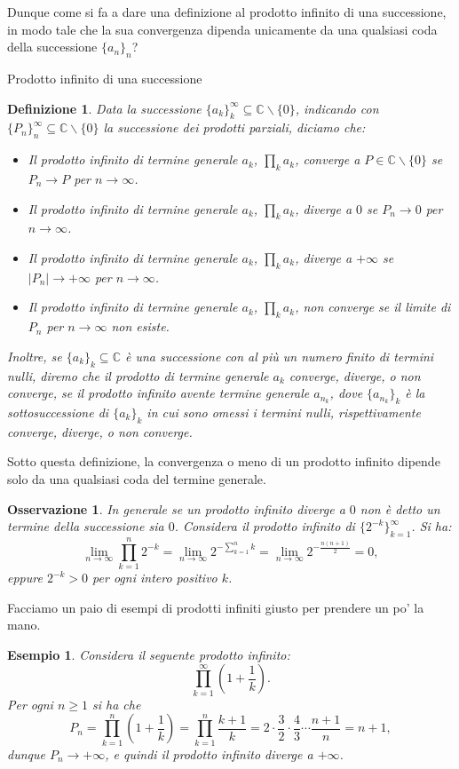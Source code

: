 \documentclass[11pt]{book}
\theoremstyle{Definizione}
\newtheorem*{mydef}{Definizione}
\theoremstyle{TeoremaProposizioneLemmaCorollarioCongettura}
\theoremstyle{OsservazioneNotaEsempio}
\newtheorem{myobs}{Osservazione}[section]
\newtheorem{myes}{Esempio}[section]
\newcommand{\C}{\mathbb{C}}
\newcommand{\tolto}{\smallsetminus}
\begin{document}
Dunque come si fa a dare una definizione al prodotto infinito di una successione, in modo tale che la sua convergenza dipenda unicamente da una qualsiasi coda della successione $\{a_n\}_n$?
\begin{boxdef}{Prodotto infinito di una successione}
\begin{mydef}
Data la successione $\{a_k\}_k^\infty\subseteq \C\tolto \{0\}$, indicando con $\{P_n\}_n^\infty\subseteq \C\tolto \{0\}$ la successione dei prodotti parziali, diciamo che:
\begin{itemize}
\item Il prodotto infinito di termine generale $a_k$, $\prod_k a_k$, converge a $P\in \C\tolto \{0\}$ se $P_n\to P$ per $n\to \infty$.
\item Il prodotto infinito di termine generale $a_k$, $\prod_k a_k$, diverge a $0$ se $P_n\to 0$ per $n\to \infty$.
\item Il prodotto infinito di termine generale $a_k$, $\prod_k a_k$, diverge a $+\infty$ se $|P_n| \to +\infty$ per $n\to \infty$.
\item Il prodotto infinito di termine generale $a_k$, $\prod_k a_k$, non converge se il limite di $P_n$ per $n\to \infty$ non esiste.
\end{itemize}
Inoltre, se $\{a_k\}_k\subseteq \C$ è una successione con al più un numero finito di termini nulli, diremo che il prodotto di termine generale $a_k$ converge, diverge, o non converge, se il prodotto infinito avente termine generale $a_{n_k}$, dove $\{a_{n_k}\}_k$ è la sottosuccessione di $\{a_k\}_k$ in cui sono omessi i termini nulli, rispettivamente converge, diverge, o non converge.
\end{mydef}
\end{boxdef}
\noindent
Sotto questa definizione, la convergenza o meno di un prodotto infinito dipende solo da una qualsiasi coda del termine generale.
\begin{myobs}
In generale se un prodotto infinito diverge a $0$ non è detto un termine della successione sia $0$. Considera il prodotto infinito di $\{2^{-k}\}_{k = 1}^\infty$. Si ha:
$$
\lim_{n \to \infty} \prod_{k = 1}^n 2^{-k} = \lim_{n\to \infty} 2^{-\sum_{k = 1}^n k} = \lim_{n \to \infty} 2^{-\frac{n(n+1)}{2}} = 0,
$$
eppure $2^{-k} > 0$ per ogni intero positivo $k$.
\end{myobs}
Facciamo un paio di esempi di prodotti infiniti giusto per prendere un po' la mano.
\begin{myes}\label{es:ProdottiInfinitiEsempio1}
Considera il seguente prodotto infinito:
$$
\prod_{k = 1}^\infty \left(1+\frac{1}{k}\right).
$$
Per ogni $n\geq 1$ si ha che
$$
P_n = \prod_{k = 1}^n \left(1+\frac{1}{k}\right) = \prod_{k = 1}^n \frac{k+1}{k} = 2\cdot \frac{3}{2}\cdot \frac{4}{3}\cdots \frac{n+1}{n} = n+1,
$$
dunque $P_n \to +\infty$, e quindi il prodotto infinito diverge a $+\infty$.
\end{myes}
\end{document}
